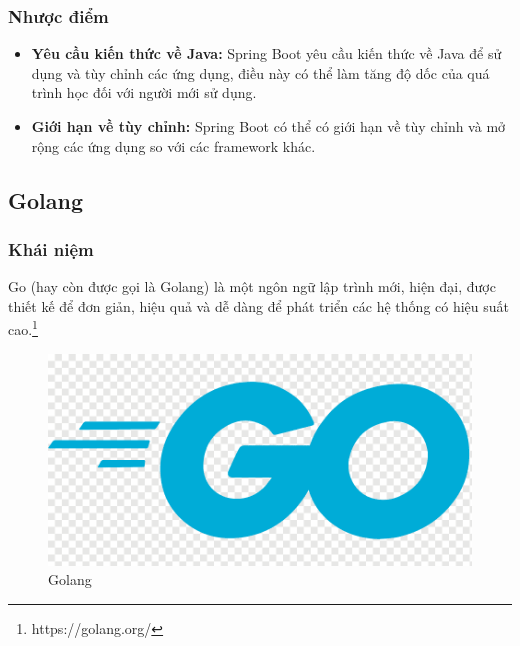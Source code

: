 \subsubsection{Nhược điểm}
\begin{itemize}
  \item \textbf{Yêu cầu kiến thức về Java:} Spring Boot yêu cầu kiến thức về Java để sử dụng và tùy chỉnh các ứng dụng, điều này có thể làm tăng độ dốc của quá trình học đối với người mới sử dụng.
  \item \textbf{Giới hạn về tùy chỉnh:} Spring Boot có thể có giới hạn về tùy chỉnh và mở rộng các ứng dụng so với các framework khác.
\end{itemize}
\subsection{Golang}
\subsubsection{Khái niệm}
\noindent Go (hay còn được gọi là Golang) là một ngôn ngữ lập trình mới, hiện đại, được thiết kế để đơn giản, hiệu quả và dễ dàng để phát triển các hệ thống có hiệu suất cao.\footnote{https://golang.org/}
\begin{figure}[H]
  \begin{center}
    \includegraphics[scale=0.25]{images/hieu/phuluc/golang.png}
    \caption{Golang}
  \end{center}
\end{figure}
